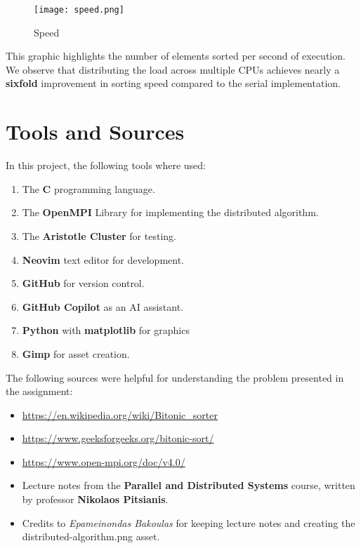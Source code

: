 \documentclass[12pt]{report}
\begin{document}
\begin{figure}[H]
    \centering
    \texttt{[image: speed.png]}
    \caption{Speed}
    \label{fig:enter-label}
\end{figure}

This graphic highlights the number of elements sorted per second of execution. We observe that distributing the load across multiple CPUs achieves nearly a \textbf{sixfold} improvement in sorting speed compared to the serial implementation.

\chapter{Tools and Sources}

In this project, the following tools where used:
\begin{enumerate}
    \item The \textbf{C} programming language.
    \item The \textbf{OpenMPI} Library for implementing the distributed algorithm.
    \item The \textbf{Aristotle Cluster} for testing.
    \item \textbf{Neovim} text editor for development.
    \item \textbf{GitHub} for version control.
    \item \textbf{GitHub Copilot} as an AI assistant.
    \item \textbf{Python} with \textbf{matplotlib} for graphics
    \item \textbf{Gimp} for asset creation.
\end{enumerate}

The following sources were helpful for understanding the problem presented in the assignment:
\begin{itemize}
    \item \url{https://en.wikipedia.org/wiki/Bitonic_sorter}
    \item \url{https://www.geeksforgeeks.org/bitonic-sort/}
    \item \url{https://www.open-mpi.org/doc/v4.0/}
    \item Lecture notes from the \textbf{Parallel and Distributed Systems} course, written by professor \textbf{Nikolaos Pitsianis}.
    \item Credits to \textit{Epameinondas Bakoulas} for keeping lecture notes and creating the distributed-algorithm.png asset.
\end{itemize}
\end{document}
